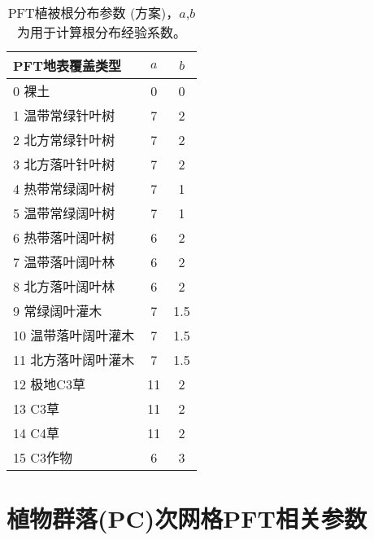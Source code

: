 \begin{table}[]
\centering
\caption{PFT植被根分布参数 (\citet{zeng2001global}方案)，$a$,$b$为用于计算根分布经验系数。}
\label{tab:PFT植被根分布参数}
\begin{tabular}{@{}lcc@{}}
\toprule
PFT地表覆盖类型     & $a$ & $b$ \\ \midrule
 0 裸土        & 0  & 0   \\
 1 温带常绿针叶树   & 7  & 2   \\
 2 北方常绿针叶树   & 7  & 2   \\
 3 北方落叶针叶树   & 7  & 2   \\
 4 热带常绿阔叶树   & 7  & 1   \\
 5 温带常绿阔叶树   & 7  & 1   \\
 6 热带落叶阔叶树   & 6  & 2   \\
 7 温带落叶阔叶林   & 6  & 2   \\
 8 北方落叶阔叶林   & 6  & 2   \\
 9 常绿阔叶灌木    & 7  & 1.5 \\
10 温带落叶阔叶灌木 & 7  & 1.5 \\
11 北方落叶阔叶灌木 & 7  & 1.5 \\
12 极地C3草    & 11 & 2   \\
13 C3草      & 11 & 2   \\
14 C4草      & 11 & 2   \\
15 C3作物     & 6  & 3  \\ \bottomrule
\end{tabular}
\end{table}

\chapter{植物群落(PC)次网格PFT相关参数}\label{植物群落PC次网格PFT相关参数}

